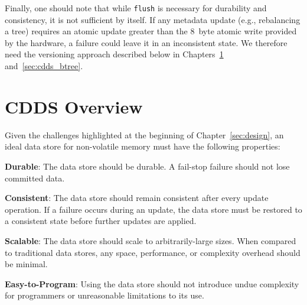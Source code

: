 Finally, one should note that while \texttt{flush} is necessary for
durability and consistency, it is not sufficient by itself.  If any
metadata update (e.g., rebalancing a tree) requires an atomic update
greater than the 8~byte atomic write provided by the hardware, a
failure could leave it in an inconsistent state.  We therefore need
the versioning approach described below in Chapters~\ref{sec:cdds_overview}
and~\ref{sec:cdds_btree}.

\section{CDDS Overview}
\label{sec:cdds_overview}

Given the challenges highlighted at the beginning of
Chapter~\ref{sec:design}, an ideal data store for non-volatile memory
must have the following properties:

\begin{smitemize}
\item \textbf{Durable}: The data store should be durable.  A fail-stop
  failure should not lose committed data.

\item \textbf{Consistent}: The data store should remain consistent
  after every update operation. If a failure occurs during an update,
  the data store must be restored to a consistent state before further
  updates are applied.

\item \textbf{Scalable}: The data store should scale to
  arbitrarily-large sizes.  When compared to traditional data stores,
  any space, performance, or complexity overhead should be minimal.

\item \textbf{Easy-to-Program}: Using the data store should not
  introduce undue complexity for programmers or unreasonable
  limitations to its use.

\end{smitemize}


